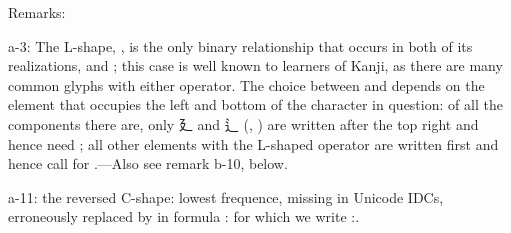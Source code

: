 {\mktsStyleItalic{}Remarks\/}:\mktsShowpar\par
{\mktsStyleBold{}a-3}: The L-shape, {}, is the only binary relationship that occurs in both of
its realizations,  and {}; this case is well known to learners of Kanji, as
there are many common glyphs with either operator. The choice between  and {
}depends on the element that occupies the left and bottom of the character in
question: of all the components there are, only {\cjk{}廴} and {\cjk{}辶} ({}, {}) are written
{\mktsStyleItalic{}after\/} the top right and hence need {}; all other elements with the L-shaped
operator are written {\mktsStyleItalic{}first\/} and hence call for {}.—Also see remark {\mktsStyleBold{}b-10},
below.\mktsShowpar\par
{\mktsStyleBold{}a-11}: the reversed C-shape: lowest frequence, missing in Unicode IDCs,
erroneously replaced by  in formula {}: for which we write {}:.\mktsShowpar\par
